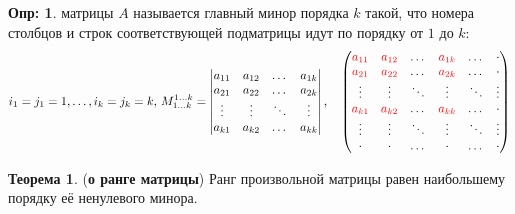 \documentclass[12pt]{article}
\theoremstyle{definition}
\newtheorem{defn}{Опр:}
\newtheorem{theorem}{Теорема}
\begin{document}
\begin{defn}
	 матрицы $A$ называется главный минор порядка $k$ такой, что номера столбцов и строк соответствующей подматрицы идут по порядку от $1$ до $k$: 
	$$
		i_1 = j_1 = 1, \dotsc, i_k = j_k = k, \, M_{1\dotsc k}^{1\dotsc k} = 	\begin{vmatrix}
			a_{11} & a_{12} & \dotsc & a_{1k}\\
			a_{21} & a_{22} & \dotsc & a_{2k}\\
			\vdots & \vdots & \ddots & \vdots\\
			a_{k1} & a_{k2} & \dotsc & a_{kk}\\
		\end{vmatrix} , \quad
		\begin{pmatrix}
			\color{red}a_{11} & \color{red}a_{12} & \dotsc & \color{red}a_{1k} & \dotsc & \cdot\\
			\color{red}a_{21} & \color{red}a_{22} & \dotsc & \color{red}a_{2k} & \dotsc & \cdot\\
			\vdots & \vdots & \ddots & \vdots & \ddots & \vdots\\
			\color{red}a_{k1} & \color{red}a_{k2} & \dotsc & \color{red}a_{kk} & \dotsc & \cdot\\
			\vdots & \vdots & \ddots & \vdots & \ddots & \vdots\\
			\cdot & \cdot & \dotsc & \cdot & \dotsc &\cdot
		\end{pmatrix}
	$$
\end{defn}

\begin{theorem}(\textbf{о ранге матрицы})
	Ранг произвольной матрицы равен наибольшему порядку её ненулевого минора.
\end{theorem}
\end{document}
